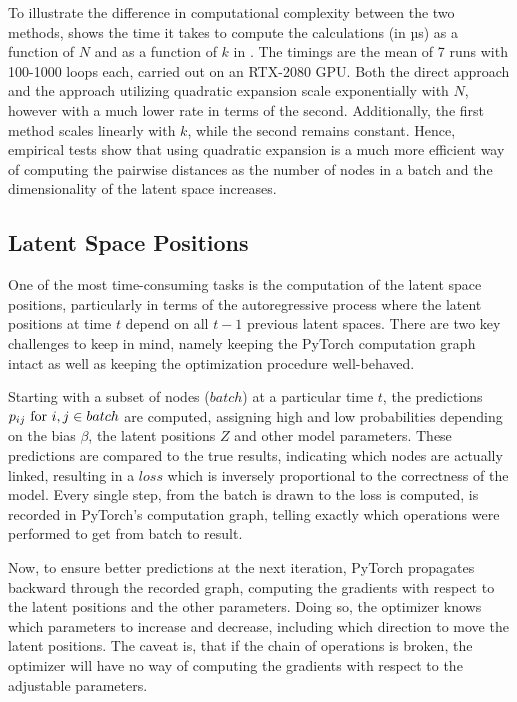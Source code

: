     To illustrate the difference in computational complexity between the two methods,  shows the time it takes to compute the calculations (in µs) as a function of $N$ and as a function of $k$ in . The timings are the mean of 7 runs with 100-1000 loops each, carried out on an RTX-2080 GPU. Both the direct approach and the approach utilizing quadratic expansion scale exponentially with $N$, however with a much lower rate in terms of the second. Additionally, the first method scales linearly with $k$, while the second remains constant. Hence, empirical tests show that using quadratic expansion is a much more efficient way of computing the pairwise distances as the number of nodes in a batch and the dimensionality of the latent space increases.
    
\subsection{Latent Space Positions}

    One of the most time-consuming tasks is the computation of the latent space positions, particularly in terms of the autoregressive process where the latent positions at time $t$ depend on all $t-1$ previous latent spaces.
    There are two key challenges to keep in mind, namely keeping the PyTorch computation graph intact as well as keeping the optimization procedure well-behaved. 
    
    Starting with a subset of nodes ($batch$) at a particular time $t$, the predictions $\sub(p)\text{ for } i,j \in batch$ are computed, assigning high and low probabilities depending on the bias $\beta$, the latent positions $Z$ and other model parameters. These predictions are compared to the true results, indicating which nodes are actually linked, resulting in a $loss$ which is inversely proportional to the correctness of the model. Every single step, from the batch is drawn to the loss is computed, is recorded in PyTorch's computation graph, telling exactly which operations were performed to get from batch to result. 
    
    Now, to ensure better predictions at the next iteration, PyTorch propagates backward through the recorded graph, computing the gradients with respect to the latent positions and the other parameters. Doing so, the optimizer knows which parameters to increase and decrease, including which direction to move the latent positions.
    The caveat is, that if the chain of operations is broken, the optimizer will have no way of computing the gradients with respect to the adjustable parameters. 
    
